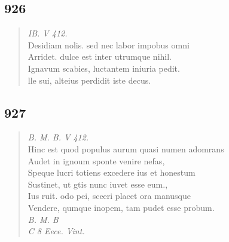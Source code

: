\documentclass[11pt, a4paper]{report}
\begin{document}
            \subsection*{926}
      \begin{verse}
      \textit{IB. V 412.} \\ Desidiam nolis. sed nec labor impobus omni \\ Arridet. dulce est inter utrumque nihil. \\ Ignavum scabies, luctantem iniuria pedit. \\ lle sui, alteius perdidit iste decus. \\ 
      \end{verse}
  
            \subsection*{927}
      \begin{verse}
      \textit{B. M. B. V 412.} \\ Hinc est quod populus aurum quasi numen adomrans \\ Audet in ignoum sponte venire nefas, \\ Speque lucri totiens excedere ius et honestum \\ Sustinet, ut gtis nunc iuvet esse eum., \\ Ius ruit. odo pei, sceeri placet ora manusque \\ Vendere, qumque inopem, tam pudet esse probum. \\ \textit{B. M. B} \\ \textit{C 8 Eece. Vint.} \\ 
      \end{verse}
  
\end{document}

